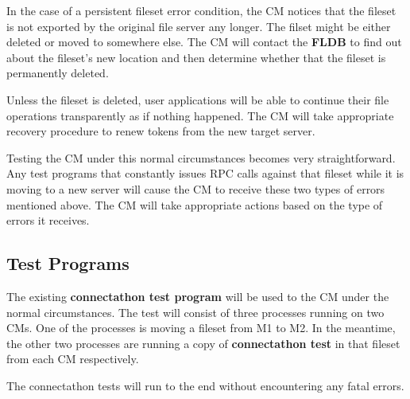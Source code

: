 In the case of a persistent fileset error condition, the CM notices that 
the fileset is not exported by the original file server any longer. 
The filset might 
be either deleted or moved to somewhere else. The CM will contact the 
{\bf FLDB} to find out about the fileset's new location and then determine 
whether that the fileset is permanently deleted. 

Unless the fileset is deleted, user applications
will be able to continue their file operations transparently as if 
nothing happened. The CM will take appropriate recovery procedure to 
renew tokens from the new target server. 

Testing the CM under this normal circumstances becomes very straightforward. 
Any test programs that constantly issues RPC calls against that fileset
while it is moving to a new server will cause the CM to receive these two 
types of errors mentioned above. The CM will take appropriate actions based
on the type of errors it receives. 

\subsection {Test Programs}

The existing {\bf connectathon test program} will be used to the CM 
under the normal circumstances. The test will consist of three processes
running on two CMs. One of the processes is moving a fileset from M1 to
M2. In the meantime, the other two processes are running a copy of 
{\bf connectathon test} in that fileset from each CM respectively. 

The connectathon tests will run to the end without encountering any fatal
errors. 



